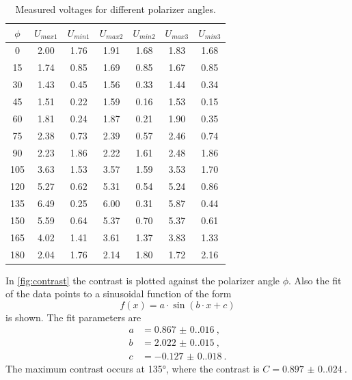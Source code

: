 \begin{table}[h]
  \centering
  \begin{tabular}{c|c|c|c|c|c|c}
  \hline
  $\phi$ & $U_{max1}$ & $U_{min1}$ & $U_{max2}$ & $U_{min2}$ & $U_{max3}$ & $U_{min3}$ \\ \hline
  \hline
  0 & 2.00 & 1.76 & 1.91 & 1.68 & 1.83 & 1.68 \\ \hline
  15 & 1.74 & 0.85 & 1.69 & 0.85 & 1.67 & 0.85 \\ \hline
  30 & 1.43 & 0.45 & 1.56 & 0.33 & 1.44 & 0.34 \\ \hline
  45 & 1.51 & 0.22 & 1.59 & 0.16 & 1.53 & 0.15 \\ \hline
  60 & 1.81 & 0.24 & 1.87 & 0.21 & 1.90 & 0.35 \\ \hline
  75 & 2.38 & 0.73 & 2.39 & 0.57 & 2.46 & 0.74 \\ \hline
  90 & 2.23 & 1.86 & 2.22 & 1.61 & 2.48 & 1.86 \\ \hline
  105 & 3.63 & 1.53 & 3.57 & 1.59 & 3.53 & 1.70 \\ \hline
  120 & 5.27 & 0.62 & 5.31 & 0.54 & 5.24 & 0.86 \\ \hline
  135 & 6.49 & 0.25 & 6.00 & 0.31 & 5.87 & 0.44 \\ \hline
  150 & 5.59 & 0.64 & 5.37 & 0.70 & 5.37 & 0.61 \\ \hline
  165 & 4.02 & 1.41 & 3.61 & 1.37 & 3.83 & 1.33 \\ \hline
  180 & 2.04 & 1.76 & 2.14 & 1.80 & 1.72 & 2.16 \\ \hline
  \end{tabular}
  \caption{Measured voltages for different polarizer angles.}
  \label{tab:contrast}
\end{table}
In \autoref{fig:contrast} the contrast is plotted against the polarizer angle $\phi$. Also the fit of the data points to a sinusoidal function of the form
\begin{equation}
  f(x) = a \cdot \sin(b \cdot x + c)
\end{equation}
is shown.
The fit parameters are
\begin{align*}
  a &= \SI{0.867(0.016)}{}, \\
  b &= \SI{2.022(0.015)}{}, \\
  c &= \SI{-0.127(0.018)}{}.
\end{align*}
The maximum contrast occurs at 135°, where the contrast is $C = \SI{0.897(0.024)}{}$.
